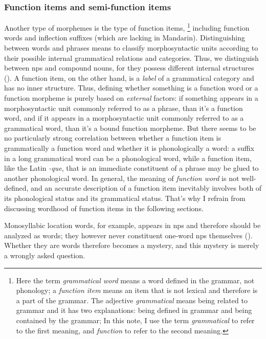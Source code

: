 \documentclass[UTF8, a4paper, oneside, scheme=plain, 12pt]{ctexrep}
\newcommand*{\term}[1]{\emph{#1}}
\newcommand{\form}[1]{\emph{#1}}
\begin{document}
\subsubsection{Function items and semi-function items} 

Another type of morphemes is the type of function items,%
\footnote{
    Here the term \term{grammatical word} 
    means a word defined in the grammar, not phonology;
    a \term{function item} means an item that is not lexical
    and therefore is a part of the grammar. 
    The adjective \term{grammatical} means being related to grammar
    and it has two explanations:
    being defined in grammar and being contained by the grammar; 
    In this note, I use the term \term{grammatical} to refer to the first meaning, 
    and \term{function} to refer to the second meaning.
} 
including function words and inflection suffixes (which are lacking in Mandarin).
Distinguishing between words and phrases 
means to classify morphosyntactic units 
according to their possible internal
grammatical relations and categories.
Thus, we distinguish between \acs{np}s and compound nouns, 
for they possess different internal structures 
().
A function item, on the other hand, is a \emph{label} of a grammatical category
and has no inner structure.
Thus, defining whether something is a function word or a function morpheme
is purely based on \emph{external} factors:
if something appears in a morphosyntactic unit commonly referred to as a phrase, 
than it's a function word, 
and if it appears in a morphosyntactic unit commonly referred to as a grammatical word, 
than it's a bound function morpheme.
But there seems to be no particularly strong correlation 
between whether a function item is grammatically a function word
and whether it is phonologically a word: 
a suffix in a long grammatical word can be a phonological word, 
while a function item, like the Latin \form{-que}, that is an immediate constituent of a phrase 
may be glued to another phonological word. 
In general, the meaning of \term{function word} is not well-defined, 
and an accurate description of a function item 
inevitably involves both of its phonological status and its grammatical status.
That's why I refrain from discussing wordhood of function items in the following sections.

Monosyllabic location words, 
for example, appears in \acs{np}s 
and therefore should be analyzed as words;
they however never constituent one-word \acs{np}s themselves
().
Whether they are words therefore becomes a mystery,
and this mystery is merely a wrongly asked question.
\end{document}
